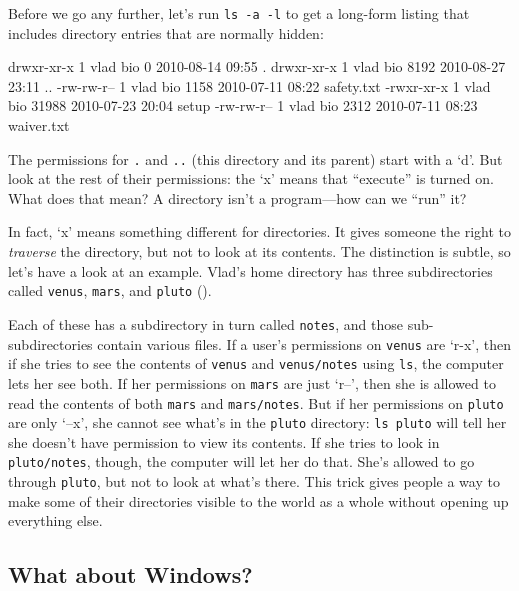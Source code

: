 Before we go any further, let's run \texttt{ls -a -l} to get a long-form
listing that includes directory entries that are normally hidden:


\begin{VerbOut}
drwxr-xr-x 1 vlad bio     0  2010-08-14 09:55 .
drwxr-xr-x 1 vlad bio  8192  2010-08-27 23:11 ..
-rw-rw-r-- 1 vlad bio  1158  2010-07-11 08:22 safety.txt
-rwxr-xr-x 1 vlad bio 31988  2010-07-23 20:04 setup
-rw-rw-r-- 1 vlad bio  2312  2010-07-11 08:23 waiver.txt
\end{VerbOut}

The permissions for \texttt{.} and \texttt{..} (this directory and its
parent) start with a `d'. But look at the rest of their permissions: the
`x' means that ``execute'' is turned on. What does that mean? A
directory isn't a program---how can we ``run'' it?

In fact, `x' means something different for directories. It gives someone
the right to \emph{traverse} the directory, but not to look at its
contents. The distinction is subtle, so let's have a look at an example.
Vlad's home directory has three subdirectories called \texttt{venus},
\texttt{mars}, and \texttt{pluto} ().


Each of these has a subdirectory in turn called \texttt{notes}, and
those sub-subdirectories contain various files. If a user's permissions
on \texttt{venus} are `r-x', then if she tries to see the contents of
\texttt{venus} and \texttt{venus/notes} using \texttt{ls}, the computer
lets her see both. If her permissions on \texttt{mars} are just `r--',
then she is allowed to read the contents of both \texttt{mars} and
\texttt{mars/notes}. But if her permissions on \texttt{pluto} are only
`--x', she cannot see what's in the \texttt{pluto} directory:
\texttt{ls pluto} will tell her she doesn't have permission to view its
contents. If she tries to look in \texttt{pluto/notes}, though, the
computer will let her do that. She's allowed to go through
\texttt{pluto}, but not to look at what's there. This trick gives people
a way to make some of their directories visible to the world as a whole
without opening up everything else.

\subsection*{What about Windows?}

